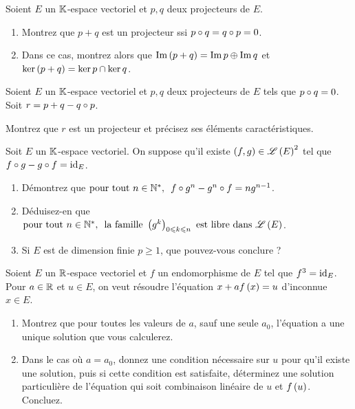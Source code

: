 \begin{exopss}[Exercice 12]
Soient \(E\) un \(\mathbb{K}\)-espace vectoriel et \(p,q\) deux projecteurs de \(E\).

\begin{enumerate}
    \item Montrez que \(p+q\) est un projecteur ssi \(p\circ q=q\circ p=0\). \\
    \item Dans ce cas, montrez alors que \(\operatorname{Im}\left(p+q\right)=\operatorname{Im} p\oplus\operatorname{Im} q\) et \(\ker\left(p+q\right)=\ker p\cap\ker q\).
\end{enumerate}
\end{exopss}



\begin{exoss}[Exercice 13]
Soient \(E\) un \(\mathbb{K}\)-espace vectoriel et \(p,q\) deux projecteurs de \(E\) tels que \(p\circ q=0\). Soit \(r=p+q-q\circ p\).

Montrez que \(r\) est un projecteur et précisez ses éléments caractéristiques.
\end{exoss}



\begin{exoss}[Exercice 14]
Soit \(E\) un \(\mathbb{K}\)-espace vectoriel. On suppose qu'il existe \(\left(f,g\right)\in\mathscr{L}\left(E\right)^2\) tel que \(f\circ g-g\circ f=\mathrm{id}_{E}\).

\begin{enumerate}
    \item Démontrez que \(\quantifs{\tpt n\in\Ns}f\rond g^n-g^n\rond f=ng^{n-1}\). \\
    \item Déduisez-en que \(\quantifs{\tpt n\in\Ns}\text{la famille }\paren{g^k}_{0\leq k\leq n}\text{ est libre dans }\Lendo{E}\). \\
    \item Si \(E\) est de dimension finie \(p\geq1\), que pouvez-vous conclure ?
\end{enumerate}
\end{exoss}



\begin{exoss}[Exercice 15]
Soient \(E\) un \(\mathbb{R}\)-espace vectoriel et \(f\) un endomorphisme de \(E\) tel que \(f^3=\mathrm{id}_{E}\). Pour \(a\in\mathbb{R}\) et \(u\in E\), on veut résoudre l'équation \(x+af\left(x\right)=u\) d'inconnue \(x\in E\).

\begin{enumerate}
    \item Montrez que pour toutes les valeurs de \(a\), sauf une seule \(a_0\), l'équation a une unique solution que vous calculerez. \\
    \item Dans le cas où \(a=a_0\), donnez une condition nécessaire sur \(u\) pour qu'il existe une solution, puis si cette condition est satisfaite, déterminez une solution particulière de l'équation qui soit combinaison linéaire de \(u\) et \(f\left(u\right)\). Concluez.
\end{enumerate}
\end{exoss}



